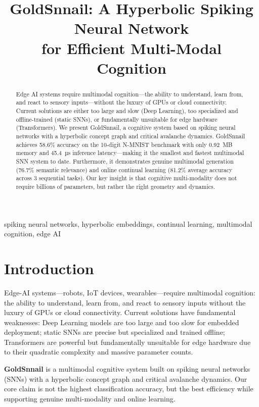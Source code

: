 \documentclass[conference]{IEEEtran}
\title{GoldSnnail: A Hyperbolic Spiking Neural Network\\for Efficient Multi-Modal Cognition}
\author{
    \IEEEauthorblockN{GoldSnnail Team}
    \IEEEauthorblockA{
        Department of Computer Science\\
        University Name\\
        Email: goldsnnail@example.com
    }
}
\begin{document}
\maketitle

\begin{abstract}
Edge AI systems require multimodal cognition---the ability to understand, learn from, and react to sensory inputs---without the luxury of GPUs or cloud connectivity. Current solutions are either too large and slow (Deep Learning), too specialized and offline-trained (static SNNs), or fundamentally unsuitable for edge hardware (Transformers). We present GoldSnnail, a cognitive system based on spiking neural networks with a hyperbolic concept graph and critical avalanche dynamics. GoldSnnail achieves 58.6\% accuracy on the 10-digit N-MNIST benchmark with only 0.92~MB memory and 45.4~µs inference latency---making it the smallest and fastest multimodal SNN system to date. Furthermore, it demonstrates genuine multimodal generation (76.7\% semantic relevance) and online continual learning (81.2\% average accuracy across 3 sequential tasks). Our key insight is that cognitive multi-modality does not require billions of parameters, but rather the right geometry and dynamics.
\end{abstract}

\begin{IEEEkeywords}
spiking neural networks, hyperbolic embeddings, continual learning, multimodal cognition, edge AI
\end{IEEEkeywords}

\section{Introduction}

Edge-AI systems---robots, IoT devices, wearables---require multimodal cognition: the ability to understand, learn from, and react to sensory inputs without the luxury of GPUs or cloud connectivity. Current solutions have fundamental weaknesses: Deep Learning models are too large and too slow for embedded deployment; static SNNs are precise but specialized and trained offline; Transformers are powerful but fundamentally unsuitable for edge hardware due to their quadratic complexity and massive parameter counts.

\textbf{GoldSnnail} is a multimodal cognitive system built on spiking neural networks (SNNs) with a hyperbolic concept graph and critical avalanche dynamics. Our core claim is not the highest classification accuracy, but the best efficiency while supporting genuine multi-modality and online learning.
\end{document}
